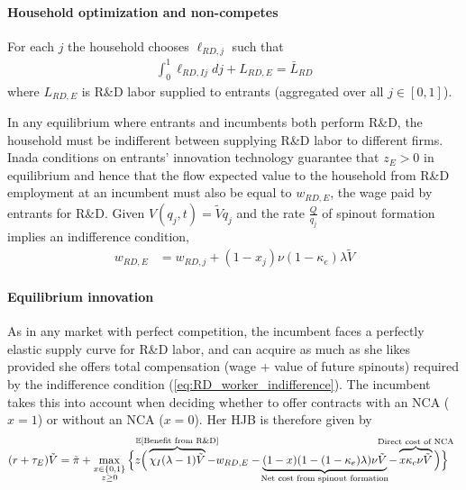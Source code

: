 \documentclass[11pt,english]{article}
\theoremstyle{remark}
\begin{document}
\paragraph{Household optimization and non-competes}

For each $j$ the household chooses $\ell_{RD,j}$ such that
\begin{align}
\int_0^1 \ell_{RD,Ij} dj + L_{RD,E} = \bar{L}_{RD}
\end{align}
where $L_{RD,E}$ is R\&D labor supplied to entrants (aggregated over all $j \in [0,1]$).

In any equilibrium where entrants and incumbents both perform R\&D, the household must be indifferent between supplying R\&D labor to different firms. Inada conditions on entrants' innovation technology guarantee that $z_E > 0$ in equilibrium and hence that the flow expected value to the household from R\&D employment at an incumbent must also be equal to $w_{RD,E}$, the wage paid by entrants for R\&D. Given $V(q_j,t) = \tilde{V}q_j$ and the rate $\frac{Q}{q_j}$ of spinout formation implies an indifference condition, 
\begin{align}
	w_{RD,E} &= w_{RD,j} + (1-x_j) \nu (1-\kappa_e) \lambda \tilde{V} \label{eq:RD_worker_indifference}
\end{align}

\paragraph{Equilibrium innovation}

As in any market with perfect competition, the incumbent faces a perfectly elastic supply curve for R\&D labor, and can acquire as much as she likes provided she offers total compensation (wage + value of future spinouts) required by the indifference condition (\ref{eq:RD_worker_indifference}). The incumbent takes this into account when deciding whether to offer contracts with an NCA ($x = 1$) or without an NCA ($x = 0$). Her HJB is therefore given by 
\begin{align}
	(r + \tau_E) \tilde{V} &= \tilde{\pi} + \max_{\substack{x \in \{0,1\} \\ z \ge 0}} \Big\{z \Big( \overbrace{\chi_I (\lambda - 1) \tilde{V}}^{\mathclap{\mathbb{E}[\textrm{Benefit from R\&D}]}}- w_{RD,E} -  \underbrace{(1-x)(1 - (1-\kappa_{e})\lambda)\nu \tilde{V}}_{\mathclap{\text{Net cost from spinout formation}}} - \overbrace{x \kappa_{c} \nu \tilde{V}}^{\mathclap{\text{Direct cost of NCA}}}\Big) \Big\} \label{eq:hjb_incumbent_workerIndiff}
\end{align}
\end{document}
